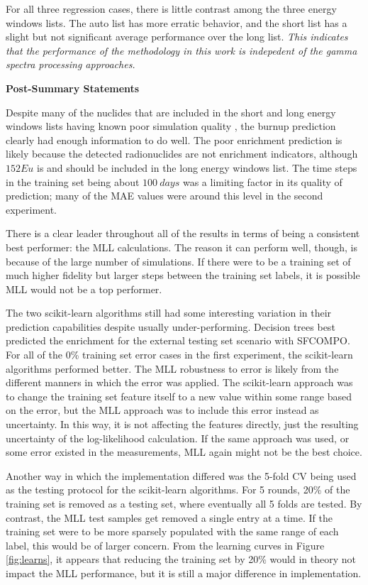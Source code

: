 For all three regression cases, there is little contrast among the three energy
windows lists. The auto list has more erratic behavior, and the short list has
a slight but not significant average performance over the long list.
\textit{This indicates that the performance of the methodology in this work is
indepedent of the gamma spectra processing approaches.} 

\noindent \textbf{Post-Summary Statements}

Despite many of the nuclides that are included in the short and long energy
windows lists having known poor simulation quality \cite{pwr_benchmark_2010,
skutnik_2021}, the burnup prediction clearly had enough information to do well.
The poor enrichment prediction is likely because the detected radionuclides are
not enrichment indicators, although ${}{152}\textit{Eu}$ is and should be
included in the long energy windows list. The time steps in the training set being about $100\:days$ was a limiting
factor in its quality of prediction; many of the \gls{MAE} values were around
this level in the second experiment. 

There is a clear leader throughout all of the results in terms of being a
consistent best performer: the \gls{MLL} calculations. The reason it can
perform well, though, is because of the large number of simulations.  If there
were to be a training set of much higher fidelity but larger steps between the
training set labels, it is possible \gls{MLL} would not be a top performer. 

The two scikit-learn algorithms still had some interesting variation in their
prediction capabilities despite usually under-performing. Decision trees best
predicted the enrichment for the external testing set scenario with
\gls{SFCOMPO}. For all of the 0\% training set error cases in the first
experiment, the scikit-learn algorithms performed better.  The \gls{MLL}
robustness to error is likely from the different manners in which the error was
applied.  The scikit-learn approach was to change the training set feature
itself to a new value within some range based on the error, but the \gls{MLL}
approach was to include this error instead as uncertainty. In this way, it is
not affecting the features directly, just the resulting uncertainty of the
log-likelihood calculation. If the same approach was used, or some error
existed in the measurements, \gls{MLL} again might not be the best choice. 

Another way in which the implementation differed was the 5-fold \gls{CV} being
used as the testing protocol for the scikit-learn algorithms. For 5 rounds,
20\% of the training set is removed as a testing set, where eventually all 5
folds are tested.  By contrast, the \gls{MLL} test samples get removed a single
entry at a time.  If the training set were to be more sparsely populated with
the same range of each label, this would be of larger concern.  From the
learning curves in Figure \ref{fig:learns}, it appears that reducing the
training set by 20\% would in theory not impact the \gls{MLL} performance, but
it is still a major difference in implementation. 

